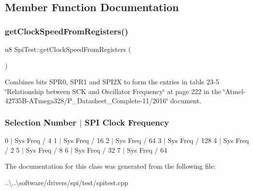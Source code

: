 \subsection{Member Function Documentation}
\mbox{\label{class_spi_test_a6f3260038241bf80545cddf4e1d73130}} 
\subsubsection{\texorpdfstring{get\+Clock\+Speed\+From\+Registers()}{getClockSpeedFromRegisters()}}
{\footnotesize\ttfamily u8 Spi\+Test\+::get\+Clock\+Speed\+From\+Registers (\begin{DoxyParamCaption}{ }\end{DoxyParamCaption})\hspace{0.3cm}{\ttfamily [inline]}}

Combines bits S\+P\+R0, S\+P\+R1 and S\+P\+I2X to form the entries in table 23-\/5 \char`\"{}\+Relationship between S\+C\+K and Oscillator Frequency\char`\"{} at page 222 in the \char`\"{}\+Atmel-\/42735\+B-\/\+A\+Tmega328/\+P\+\_\+\+Datasheet\+\_\+\+Complete-\/11/2016\char`\"{} document.

\subsubsection*{Selection Number $\vert$ S\+PI Clock Frequency }

0 $\vert$ Sys Freq / 4 1 $\vert$ Sys Freq / 16 2 $\vert$ Sys Freq / 64 3 $\vert$ Sys Freq / 128 4 $\vert$ Sys Freq / 2 5 $\vert$ Sys Freq / 8 6 $\vert$ Sys Freq / 32 7 $\vert$ Sys Freq / 64 

The documentation for this class was generated from the following file\+:\begin{DoxyCompactItemize}
\item 
..\textbackslash{}..\textbackslash{}software/drivers/spi/test/spitest.\+cpp\end{DoxyCompactItemize}
